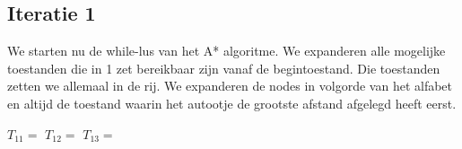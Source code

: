 \documentclass[alternative-exam.tex]{subfiles}
\begin{document}
\subsection{Iteratie 1}
We starten nu de while-lus van het A* algoritme. We expanderen alle mogelijke toestanden die in 1 zet bereikbaar zijn vanaf de begintoestand. Die toestanden zetten we allemaal in de rij. We expanderen de nodes in volgorde van het alfabet en altijd de toestand waarin het autootje de grootste afstand afgelegd heeft eerst.

\begin{center}
$T_{11} = $
$T_{12} = $
$T_{13} = $
\end{center}
\end{document}
